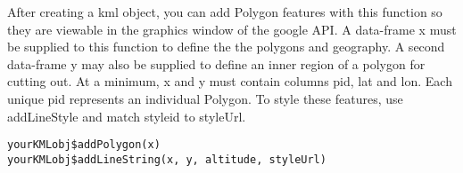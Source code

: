 \documentclass[a4paper]{book}
\begin{document}
%
\begin{Description}\relax
After creating a kml object, you can add Polygon features with this function so they are viewable in the graphics window of the google API. A data-frame x must be supplied to this function to define the the polygons and geography. A second data-frame y may also be supplied to define an inner region of a polygon for cutting out. At a minimum, x and y must contain columns pid, lat and lon.  Each unique pid represents an individual Polygon. To style these features, use addLineStyle and match styleid to styleUrl. 
\end{Description}
%
\begin{Usage}
\begin{verbatim}
yourKMLobj$addPolygon(x)
yourKMLobj$addLineString(x, y, altitude, styleUrl)
\end{verbatim}
\end{Usage}
%
\end{document}
